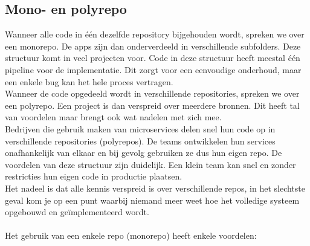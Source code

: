 \subsection{Mono- en polyrepo}
Wanneer alle code in één dezelfde repository bijgehouden wordt, spreken we over een monorepo. De apps zijn dan onderverdeeld in verschillende subfolders. Deze structuur komt in veel projecten voor. Code in deze structuur heeft meestal één pipeline voor de implementatie. Dit zorgt voor een eenvoudige onderhoud, maar een enkele bug kan het hele proces vertragen.\\ 
Wanneer de code opgedeeld wordt in verschillende repositories, spreken we over een polyrepo. Een project is dan verspreid over meerdere bronnen. Dit heeft tal van voordelen maar brengt ook wat nadelen met zich mee.\\
Bedrijven die gebruik maken van microservices delen snel hun code op in verschillende repositories (polyrepos).  De teams ontwikkelen hun services onafhankelijk van elkaar en bij gevolg gebruiken ze dus hun eigen repo. De voordelen van deze structuur zijn duidelijk. Een klein team kan snel en zonder restricties hun eigen code in productie plaatsen.\\  
Het nadeel is dat alle kennis verspreid is over verschillende repos, in het slechtste geval kom je op een punt waarbij niemand meer weet hoe het volledige systeem opgebouwd en geïmplementeerd wordt. \\
\\
Het gebruik van een enkele repo (monorepo) heeft enkele voordelen:
